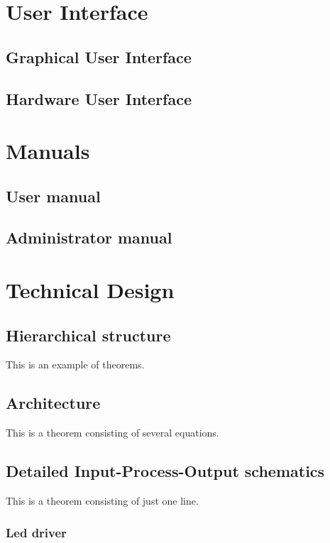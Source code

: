 \documentclass[11pt,fleqn,,a4paper,twoside,openright]{book}
\begin{document}
\chapter{User Interface}\label{UserInterface}

\section{Graphical User Interface}


\section{Hardware User Interface}

\chapter{Manuals}\label{manuals}

\section{User manual}

\section{Administrator manual}

\chapter{Technical Design}

\section{Hierarchical structure} 

This is an example of theorems.

\section{Architecture} 
This is a theorem consisting of several equations.

\section{Detailed Input-Process-Output schematics} 
This is a theorem consisting of just one line.

\subsection{Led driver}

\end{document}
